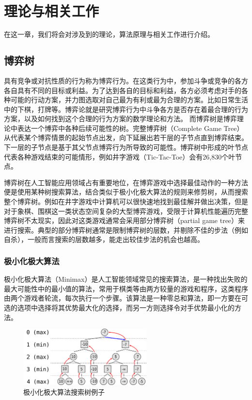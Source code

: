 \chapter{理论与相关工作}
\label{chap:theory}
在这一章，我们将会对涉及到的理论，算法原理与相关工作进行介绍。
\section{博弈树}
具有竞争或对抗性质的行为称为博弈行为。在这类行为中，参加斗争或竞争的各方各自具有不同的目标或利益。为了达到各自的目标和利益，各方必须考虑对手的各种可能的行动方案，并力图选取对自己最为有利或最为合理的方案。比如日常生活中的下棋，打牌等。博弈论就是研究博弈行为中斗争各方是否存在着最合理的行为方案，以及如何找到这个合理的行为方案的数学理论和方法\cite{gt}。
而博弈树是博弈理论中表达一个博弈中各种后续可能性的树。完整博弈树（Complete Game Tree）从代表某个博弈情景的起始节点出发，向下延展出若干层的子节点直到博弈结束。下一层的子节点是基于其父节点博弈行为所导致的可能性。博弈树中形成的叶节点代表各种游戏结束的可能情形，例如井字游戏（Tic-Tac-Toe）会有26,830个叶节点\cite{NAU1982257,allis1994searching}。


博弈树在人工智能应用领域占有重要地位，在博弈游戏中选择最佳动作的一种方法便是使用某种树搜索算法，结合类似于极小化极大算法的规则来修剪树，从而搜索整个博弈树。例如在井字游戏中计算机可以很快速地找到最佳解并做出决策，但是对于象棋、围棋这一类状态空间复杂的大型博弈游戏，受限于计算机性能遍历完整博弈树不太现实，因此对这类游戏通常会采用部分博弈树（partial game tree）来进行搜索。典型的部分博弈树通常是限制博弈树的层数，并剔除不佳的步法（例如自杀），一般而言搜索的层数越多，能走出较佳步法的机会也越高\cite{coin12162}。

\subsection{极小化极大算法}
极小化极大算法（Minimax）是人工智能领域常见的搜索算法，是一种找出失败的最大可能性中的最小值的算法，常用于棋类等由两方较量的游戏和程序，这类程序由两个游戏者轮流，每次执行一个步骤。该算法是一种零总和算法，即一方要在可选的选项中选择将其优势最大化的选择，而另一方则选择令对手优势最小化的方法\cite{ctt1r2gkx}。

\begin{figure}[htb]
    \centering
    \includegraphics[width=0.6\textwidth]{Minimax.png}
    \caption[minimax]{%
      极小化极大算法搜索树例子\cite{wikiMinimax}%
      }
    \label{fig:minimax}
  \end{figure}

